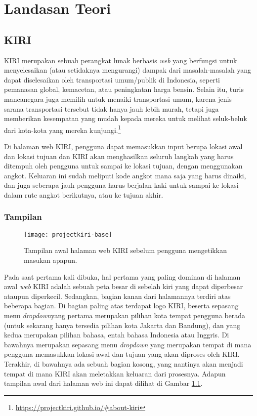 \chapter{Landasan Teori}
\label{chap:teori}

\section{KIRI}
\label{sec:kiri}

KIRI merupakan sebuah perangkat lunak berbasis \textit{web} yang berfungsi untuk menyelesaikan (atau setidaknya mengurangi) dampak dari masalah-masalah yang dapat diselesaikan oleh transportasi umum/publik di Indonesia, seperti pemanasan global, kemacetan, atau peningkatan harga bensin. Selain itu, turis mancanegara juga memilih untuk menaiki transportasi umum, karena jenis sarana transportasi tersebut tidak hanya jauh lebih murah, tetapi juga memberikan kesempatan yang mudah kepada mereka untuk melihat seluk-beluk dari kota-kota yang mereka kunjungi.\footnote{\href{https://projectkiri.github.io/\#about-kiri}{https://projectkiri.github.io/\#about-kiri}}

Di halaman web KIRI, pengguna dapat memasukkan input berupa lokasi awal dan lokasi tujuan dan KIRI akan menghasilkan seluruh langkah yang harus ditempuh oleh pengguna untuk sampai ke lokasi tujuan, dengan menggunakan angkot. Keluaran ini sudah meliputi kode angkot mana saja yang harus dinaiki, dan juga seberapa jauh pengguna harus berjalan kaki untuk sampai ke lokasi dalam rute angkot berikutnya, atau ke tujuan akhir.

\subsection{Tampilan}
\label{sec:kiri-appearance}

\begin{figure}[h]
    \centering
    \texttt{[image: projectkiri-base]}
    \caption[Tampilan halaman web KIRI sebelum masukan diketikkan]{Tampilan awal halaman web KIRI sebelum pengguna mengetikkan masukan apapun.}
    \label{fig:kiri-base}
\end{figure}

Pada saat pertama kali dibuka, hal pertama yang paling dominan di halaman awal \textit{web} KIRI adalah sebuah peta besar di sebelah kiri yang dapat diperbesar ataupun diperkecil. Sedangkan, bagian kanan dari halamannya terdiri atas beberapa bagian. Di bagian paling atas terdapat logo KIRI, beserta sepasang menu \textit{dropdown}\textemdash yang pertama merupakan pilihan kota tempat pengguna berada (untuk sekarang hanya tersedia pilihan kota Jakarta dan Bandung), dan yang kedua merupakan pilihan bahasa, entah bahasa Indonesia atau Inggris. Di bawahnya merupakan sepasang menu \textit{dropdown} yang merupakan tempat di mana pengguna memasukkan lokasi awal dan tujuan yang akan diproses oleh KIRI. Terakhir, di bawahnya ada sebuah bagian kosong, yang nantinya akan menjadi tempat di mana KIRI akan meletakkan keluaran dari prosesnya. Adapun tampilan awal dari halaman web ini dapat dilihat di Gambar \ref{fig:kiri-base}.

